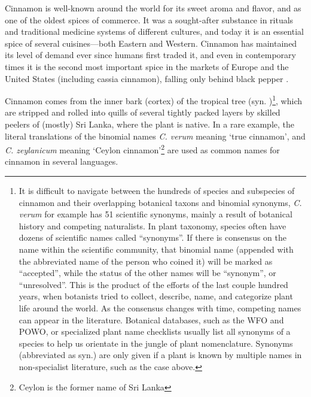 Cinnamon is well-known around the world for its sweet aroma and flavor, and as one of the oldest spices of commerce. It was a sought-after substance in rituals and traditional medicine systems of different cultures, and today it is an essential spice of several cuisines---both Eastern and Western. Cinnamon has maintained its level of demand ever since humans first traded it, and even in contemporary times it is the second most important spice in the markets of Europe and the United States (including cassia cinnamon), falling only behind black pepper \parencite[]{ravindran_cinnamon_2004}.

Cinnamon comes from the inner bark (cortex) of the tropical tree  (syn. )\footnote{It is difficult to navigate between the hundreds of species and subspecies of cinnamon and their overlapping botanical taxons and binomial synonyms, \textit{C. verum} for example has 51 scientific synonyms, mainly a result of botanical history and competing naturalists. In plant taxonomy, species often have dozens of scientific names called ``synonyms''. If there is consensus on the name within the scientific community, that binomial name (appended with the abbreviated name of the person who coined it) will be marked as ``accepted'', while the status of the other names will be ``synonym'', or ``unresolved''. This is the product of the efforts of the last couple hundred years, when botanists tried to collect, describe, name, and categorize plant life around the world. As the consensus changes with time, competing names can appear in the literature. Botanical databases, such as the \gls{WFO} and \gls{POWO}, or specialized plant name checklists usually list all synonyms of a species to help us orientate in the jungle of plant nomenclature. Synonyms (abbreviated as syn.) are only given if a plant is known by multiple names in non-specialist literature, such as the case above.}, which are stripped and rolled into quills of several tightly packed layers by skilled peelers of (mostly) Sri Lanka, where the plant is native. In a rare example, the literal translations of the binomial names \textit{C. verum} meaning `true cinnamon', and \textit{C. zeylanicum} meaning `Ceylon cinnamon'\footnote{Ceylon is the former name of Sri Lanka} are used as common names for cinnamon in several languages. 




